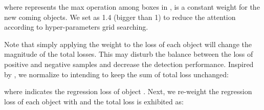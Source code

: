 \documentclass[10pt,twocolumn,letterpaper]{article}
\begin{document}
where  represents the max operation among boxes in ,  is a constant weight for the new coming objects. We set  as 1.4 (bigger than 1) to reduce the attention according to hyper-parameters grid searching.

Note that simply applying the weight to the loss of each object will
change the magnitude of the total losses. This may disturb the balance between the loss of positive and negative samples and decrease the detection performance. Inspired by \cite{ioubb,ggiou}, we normalize  to  intending to keep the sum of total loss unchanged: 


where  indicates the regression loss of object . Next, we re-weight the regression loss of each object with  and the total loss is exhibited as:  




\begin{table*}[t]
\vspace{-.2em}
\centering
{}
\centering
\hspace{1em}
\end{table*}
\end{document}
